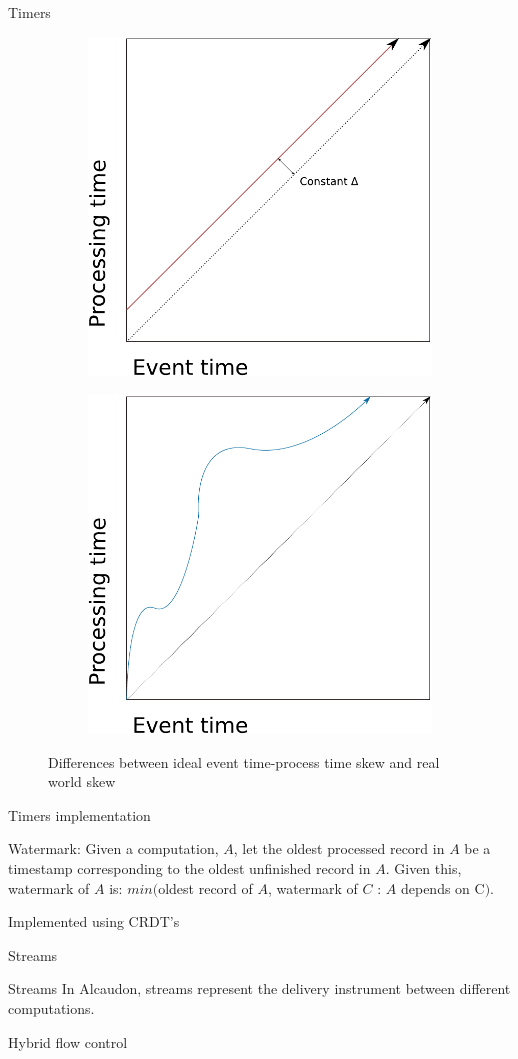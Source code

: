 \documentclass[10pt]{beamer}
\begin{document}
\begin{frame}[fragile]{Timers}
\begin{figure}
\centering
\begin{subfigure}
  \centering
  \includegraphics[width=0.4\linewidth]{../figures/constantskew.pdf}
\end{subfigure}%
\begin{subfigure}
  \centering
  \includegraphics[width=0.4\linewidth]{../figures/realskew.pdf}
\end{subfigure}
\caption{Differences between ideal event time-process time skew and real world skew}
\label{fig:skew}
\end{figure}
\end{frame}

\begin{frame}[fragile]{Timers implementation}
  \begin{definition}{Watermark:}
    Given a computation, $A$, let the oldest processed record in $A$ be a timestamp
    corresponding to the oldest unfinished record in $A$.
    Given this, watermark of $A$ is:
    $min($oldest record of $A$, watermark of $C$ : $A$ depends on C$)$.
  \end{definition}
  Implemented using CRDT's
\end{frame}

\begin{frame}[fragile]{Streams}
  \begin{block}{Streams}
    In Alcaudon, streams represent the delivery instrument between different
    computations.
  \end{block}

  Hybrid flow control
\end{frame}
\end{document}
